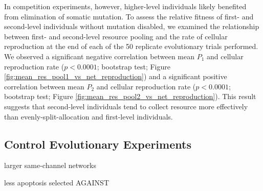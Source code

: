 

In competition experiments, however, higher-level individuals likely benefited from elimination of somatic mutation.
To assess the relative fitness of first- and second-level individuals without mutation disabled, we examined the relationship between first- and second-level resource pooling and the rate of cellular reproduction at the end of each of the 50 replicate evolutionary trials performed.
We observed a significant negative correlation between mean $P_1$ and cellular reproduction rate ($p < 0.0001$; bootstrap test; Figure \ref{fig:mean_res_pool1_vs_net_reproduction}) and a significant positive correlation between mean $P_2$ and cellular reproduction rate ($p < 0.0001$; bootstrap test; Figure \ref{fig:mean_res_pool2_vs_net_reproduction}).
This result suggests that second-level individuals tend to collect resource more effectively than evenly-split-allocation and first-level individuals.

\subsection{Control Evolutionary Experiments}

larger same-channel networks

less apoptosis
selected AGAINST
